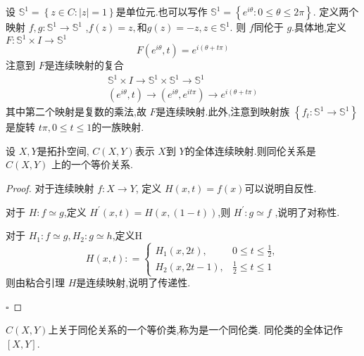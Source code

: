 \documentclass[../../几何与拓扑.tex]{subfiles}
\begin{document}
\begin{example}
    设 \(  \mathbb{S}^{1} =  \left\{ z \in C : \left| z  \right|=  1  \right\}  \)是单位元.也可以写作 \(  \mathbb{S}^{1} =  \left\{ e^{i \theta }: 0\le  \theta \le 2\pi  \right\}  \).
    定义两个映射 \(  f,g  : \mathbb{S}^{1}\to \mathbb{S}^{1}\)   ,\(  f\left( z \right)= z,\text{和} g\left( z \right)= -z,z \in \mathbb{S}^{1}    \). 
    则 \(  f  \)同伦于 \(  g  \).具体地,定义 \(  F: \mathbb{S}^{1}\times I\to \mathbb{S}^{1}  \) \[
    F\left( e^{i \theta },t \right)=  e^{i\left(  \theta + t\pi  \right) } 
    \] 注意到 \(  F  \)是连续映射的复合 \[
    \begin{aligned}
    \mathbb{S}^{1}\times I \to \mathbb{S}^{1}\times \mathbb{S}^{1} \to \mathbb{S}^{1} \\ 
     \left( e^{i \theta },t \right) \to \left( e^{i \theta },e^{it\pi } \right)\to e^{i\left(  \theta + t\pi  \right) }  
    \end{aligned}
    \]其中第二个映射是复数的乘法,故 \(  F  \)是连续映射.此外,注意到映射族 \(  \left\{ f_{t}: \mathbb{S}^{1}\to \mathbb{S}^{1} \right\}  \)是旋转 \(  t\pi   ,0\le t\le 1\)的一族映射.        
\end{example}

\begin{theorem}
    设 \(  X,Y  \)是拓扑空间, \(  C\left( X,Y \right)   \)表示 \(  X  \)到 \(  Y  \)的全体连续映射.则同伦关系是 \(  C\left( X,Y \right)   \)
    上的一个等价关系.     
\end{theorem}

\begin{proof}

    对于连续映射 \(  f:X\to Y  \), 定义 \(  H\left( x,t \right)= f\left( x \right)    \)可以说明自反性.
    
    对于 \(  H: f\simeq g  \),定义 \(  H^{\prime} \left( x,t \right)= H\left( x,\left( 1-t \right)  \right)    \),则 \(  H^{\prime} :g\simeq f  \)  ,说明了对称性.

    对于 \(  H_1: f \simeq g,H_2:g\simeq h  \),定义H \[
    H\left( x,t \right): =  \begin{cases} H_1\left( x,2t \right),& 0\le t\le \frac{1}{2},\\ 
     H_2\left( x,2t-1 \right),& \frac{1}{2}\le t\le 1   \end{cases}  
    \]则由粘合引理 \(  H  \)是连续映射,说明了传递性.  

    \hfill $\square$
\end{proof}

\begin{definition}
    \(  C\left( X,Y \right)   \)上关于同伦关系的一个等价类,称为是一个同伦类. 同伦类的全体记作 \(  [X,Y]  \).  
\end{definition}
\end{document}
